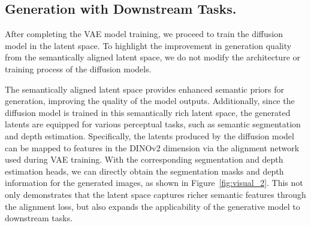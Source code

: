 \subsection{Generation with Downstream Tasks.}

After completing the VAE model training, we proceed to train the diffusion model in the latent space. To highlight the improvement in generation quality from the semantically aligned latent space, we do not modify the architecture or training process of the diffusion models.

The semantically aligned latent space provides enhanced semantic priors for generation, improving the quality of the model outputs. Additionally, since the diffusion model is trained in this semantically rich latent space, the generated latents are equipped for various perceptual tasks, such as semantic segmentation and depth estimation.
Specifically, the latents produced by the diffusion model can be mapped to features in the DINOv2 dimension via the alignment network used during VAE training. With the corresponding segmentation and depth estimation heads, we can directly obtain the segmentation masks and depth information for the generated images, as shown in Figure~\ref{fig:visual_2}. This not only demonstrates that the latent space captures richer semantic features through the alignment loss, but also expands the applicability of the generative model to downstream tasks.